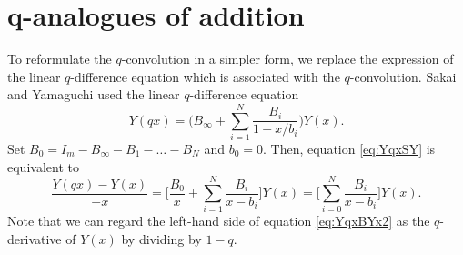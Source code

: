 \documentclass[pdftex]{sigma}
\numberwithin{equation}{section}
\theoremstyle{definition}
\begin{document}
\section[q-analogues of addition]{$\boldsymbol{q}$-analogues of addition} \label{sec:add}
To reformulate the $q$-convolution in a simpler form, we replace the expression of the linear $q$-difference equation which is associated with the $q$-convolution.
Sakai and Yamaguchi used the linear $q$-difference equation
\begin{equation}
 Y(qx)= \Biggl( B_{\infty}+\sum_{i=1}^N \frac{B_i}{1-x/b_i} \Biggr) Y(x).
\label{eq:YqxSY}
\end{equation}
Set $B_0 = I_m - B_\infty - B_{1} - \dots -B_N$ and $b_0=0$.
Then, equation \eqref{eq:YqxSY}
 is equivalent to
\begin{equation}
\frac{Y(q x) - Y(x )}{-x} = \Biggl[ \frac{B_{0}}{x} + \sum^{N}_{i = 1}\frac{B_{i}}{x -b_{i}} \Biggr] Y(x) = \Biggl[ \sum^{N}_{i = 0}\frac{B_{i}}{x -b_{i}} \Biggr] Y(x).
\label{eq:YqxBYx2}
\end{equation}
Note that we can regard the left-hand side of equation \eqref{eq:YqxBYx2} as the $q$-derivative of $Y(x)$ by dividing by $1-q$.
\end{document}
